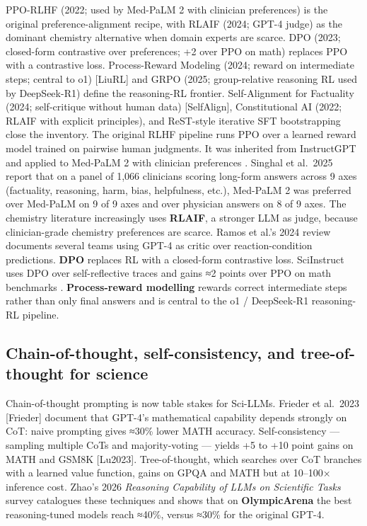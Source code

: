 \documentclass{article}
\begin{document}
PPO-RLHF (2022; used by Med-PaLM 2 with clinician preferences) \cite{singhal2025towardexpertlevelm} is the original preference-alignment recipe, with RLAIF (2024; GPT-4 judge) \cite{ramos2024chemicalscience202} as the dominant chemistry alternative when domain experts are scarce. DPO (2023; closed-form contrastive over preferences; +2 over PPO on math) \cite{zhang2024sciinstructaselfre} replaces PPO with a contrastive loss. Process-Reward Modeling (2024; reward on intermediate steps; central to o1) {[}LiuRL{]} and GRPO (2025; group-relative reasoning RL used by DeepSeek-R1) define the reasoning-RL frontier. Self-Alignment for Factuality (2024; self-critique without human data) {[}SelfAlign{]}, Constitutional AI (2022; RLAIF with explicit principles), and ReST-style iterative SFT bootstrapping close the inventory. The original RLHF pipeline runs PPO over a learned reward model trained on pairwise human judgments. It was inherited from InstructGPT and applied to Med-PaLM 2 with clinician preferences \cite{singhal2025towardexpertlevelm}. Singhal et al.~2025 \cite{singhal2025towardexpertlevelm} report that on a panel of 1,066 clinicians scoring long-form answers across 9 axes (factuality, reasoning, harm, bias, helpfulness, etc.), Med-PaLM 2 was preferred over Med-PaLM on 9 of 9 axes and over physician answers on 8 of 9 axes. The chemistry literature increasingly uses \textbf{RLAIF}, a stronger LLM as judge, because clinician-grade chemistry preferences are scarce. Ramos et al.'s 2024 review \cite{ramos2024chemicalscience202} documents several teams using GPT-4 as critic over reaction-condition predictions. \textbf{DPO} replaces RL with a closed-form contrastive loss. SciInstruct uses DPO over self-reflective traces and gains ≈2 points over PPO on math benchmarks \cite{zhang2024sciinstructaselfre}. \textbf{Process-reward modelling} rewards correct intermediate steps rather than only final answers and is central to the o1 / DeepSeek-R1 reasoning-RL pipeline.

\subsection{Chain-of-thought, self-consistency, and tree-of-thought for science}\label{chain-of-thought-self-consistency-and-tree-of-thought-for-science}

Chain-of-thought prompting is now table stakes for Sci-LLMs. Frieder et al.~2023 {[}Frieder{]} document that GPT-4's mathematical capability depends strongly on CoT: naive prompting gives ≈30\% lower MATH accuracy. Self-consistency --- sampling multiple CoTs and majority-voting --- yields +5 to +10 point gains on MATH and GSM8K {[}Lu2023{]}. Tree-of-thought, which searches over CoT branches with a learned value function, gains on GPQA and MATH but at 10--100× inference cost. Zhao's 2026 \emph{Reasoning Capability of LLMs on Scientific Tasks} survey \cite{zhao2026appliedandcomputat} catalogues these techniques and shows that on \textbf{OlympicArena} the best reasoning-tuned models reach ≈40\%, versus ≈30\% for the original GPT-4.
\end{document}
